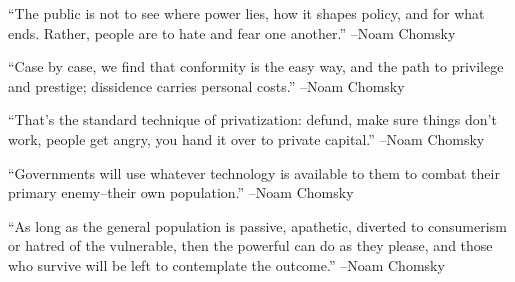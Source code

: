 \documentclass{article}%
\begin{document}
\linebreak%
\vspace{1mm}%
\begin{minipage}{\textwidth}%
\flushleft%
“The public is not to see where power lies, how it shapes policy, and for what ends. Rather, people are to hate and fear one another.”%
\linebreak%
\vspace{1mm}%
–Noam Chomsky%
\linebreak%
\vspace{1mm}%
\end{minipage}%
\linebreak%
\vspace{1mm}%
\begin{minipage}{\textwidth}%
\flushleft%
“Case by case, we find that conformity is the easy way, and the path to privilege and prestige; dissidence carries personal costs.”%
\linebreak%
\vspace{1mm}%
–Noam Chomsky%
\linebreak%
\vspace{1mm}%
\end{minipage}%
\linebreak%
\vspace{1mm}%
\begin{minipage}{\textwidth}%
\flushleft%
“That's the standard technique of privatization: defund, make sure things don't work, people get angry, you hand it over to private capital.”%
\linebreak%
\vspace{1mm}%
–Noam Chomsky%
\linebreak%
\vspace{1mm}%
\end{minipage}%
\linebreak%
\vspace{1mm}%
\begin{minipage}{\textwidth}%
\flushleft%
“Governments will use whatever technology is available to them to combat their primary enemy–their own population.”%
\linebreak%
\vspace{1mm}%
–Noam Chomsky%
\linebreak%
\vspace{1mm}%
\end{minipage}%
\linebreak%
\vspace{1mm}%
\begin{minipage}{\textwidth}%
\flushleft%
“As long as the general population is passive, apathetic, diverted to consumerism or hatred of the vulnerable, then the powerful can do as they please, and those who survive will be left to contemplate the outcome.”%
\linebreak%
\vspace{1mm}%
–Noam Chomsky%
\linebreak%
\vspace{1mm}%
\end{minipage}%
\end{document}
